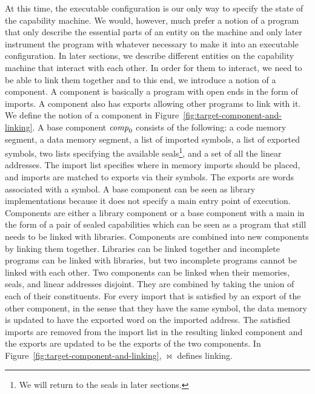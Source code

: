 \documentclass[acmsmall,review,anonymous]{acmart}\settopmatter{printfolios=true,printccs=false,printacmref=false}
\renewcommand{\comp}{\var{comp}}
\begin{document}
At this time, the executable configuration is our only way to specify the state of the capability machine.
We would, however, much prefer a notion of a program that only describe the essential parts of an entity on the machine and only later instrument the program with whatever necessary to make it into an executable configuration.
In later sections, we describe different entities on the capability machine that interact with each other.
In order for them to interact, we need to be able to link them together and to this end, we introduce a notion of a component.
A component is basically a program with open ends in the form of imports.
A component also has exports allowing other programs to link with it.
We define the notion of a component in Figure~\ref{fig:target-component-and-linking}.
A base component $\comp_0$ consists of the following: a code memory segment, a data memory segment, a list of imported symbols, a list of exported symbols, two lists specifying the available seals\footnote{We will return to the seals in later sections.}, and a set of all the linear addresses.
The import list specifies where in memory imports should be placed, and imports are matched to exports via their symbols.
The exports are words associated with a symbol.
A base component can be seen as library implementations because it does not specify a main entry point of execution.
Components are either a library component or a base component with a main in the form of a pair of sealed capabilities which can be seen as a program that still needs to be linked with libraries.
Components are combined into new components by linking them together.
Libraries can be linked together and incomplete programs can be linked with libraries, but two incomplete programs cannot be linked with each other.
Two components can be linked when their memories, seals, and linear addresses disjoint.
They are combined by taking the union of each of their constituents.
For every import that is satisfied by an export of the other component, in the sense that they have the same symbol, the data memory is updated to have the exported word on the imported address.
The satisfied imports are removed from the import list in the resulting linked component and the exports are updated to be the exports of the two components.
In Figure~\ref{fig:target-component-and-linking}, $\bowtie$ defines linking.
\end{document}
